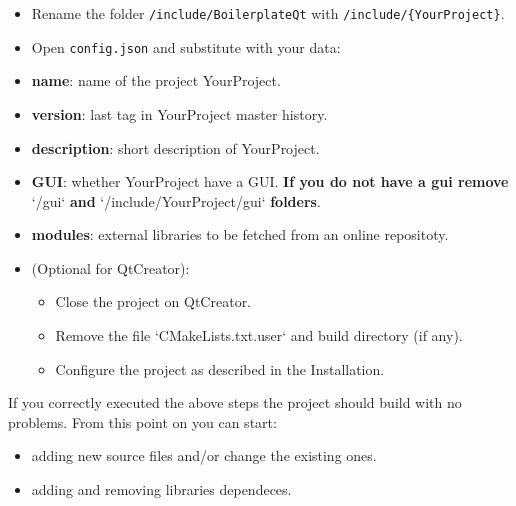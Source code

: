 \begin{itemize}
      \tightlist
      \item
            Rename the folder \texttt{/include/BoilerplateQt} with
            \texttt{/include/\{YourProject\}}.
      \item
            Open \texttt{config.json} and substitute with your data:
      \item \textbf{name}: name of the project {YourProject}.

      \item \textbf{version}: last tag in {YourProject} master history.

      \item \textbf{description}: short description of {YourProject}.

      \item \textbf{GUI}: whether {YourProject} have a GUI. \textbf{If you do not have a gui remove} `/gui` \textbf{and} `/include/{YourProject}/gui` \textbf{folders}.

      \item \textbf{modules}: external libraries to be fetched from an online repositoty.
      \item
            (Optional for QtCreator):
            \begin{itemize}
                  \tightlist
                  \item Close the project on QtCreator.

                  \item Remove the file `CMakeLists.txt.user` and build directory (if any).

                  \item Configure the project as described in the Installation.
            \end{itemize}
\end{itemize}


If you correctly executed the above steps the project should build with
no problems. From this point on you can start:

\begin{itemize}
      \tightlist
      \item
            adding new source files and/or change the existing ones.
      \item
            adding and removing libraries dependeces.
\end{itemize}

